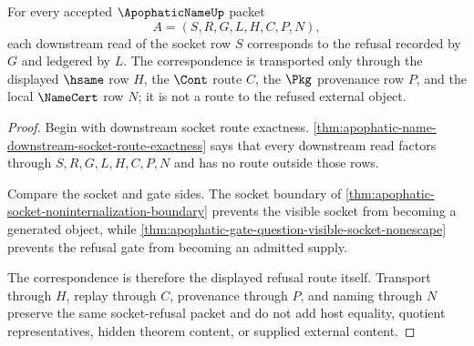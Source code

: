 \begin{theorem}
\label{thm:apophatic-name-socket-refusal-correspondence}
For every accepted $\ApophaticNameUp$ packet
$$
A=(S,R,G,L,H,C,P,N),
$$
each downstream read of the socket row $S$ corresponds to the refusal recorded by $G$ and ledgered by $L$. The correspondence is transported only through the displayed $\hsame$ row $H$, the $\Cont$ route $C$, the $\Pkg$ provenance row $P$, and the local $\NameCert$ row $N$; it is not a route to the refused external object.
\end{theorem}
\begin{proof}
Begin with downstream socket route exactness. \autoref{thm:apophatic-name-downstream-socket-route-exactness} says that every downstream read factors through $S,R,G,L,H,C,P,N$ and has no route outside those rows.

Compare the socket and gate sides. The socket boundary of \autoref{thm:apophatic-socket-noninternalization-boundary} prevents the visible socket from becoming a generated object, while \autoref{thm:apophatic-gate-question-visible-socket-nonescape} prevents the refusal gate from becoming an admitted supply.

The correspondence is therefore the displayed refusal route itself. Transport through $H$, replay through $C$, provenance through $P$, and naming through $N$ preserve the same socket-refusal packet and do not add host equality, quotient representatives, hidden theorem content, or supplied external content.
\end{proof}


